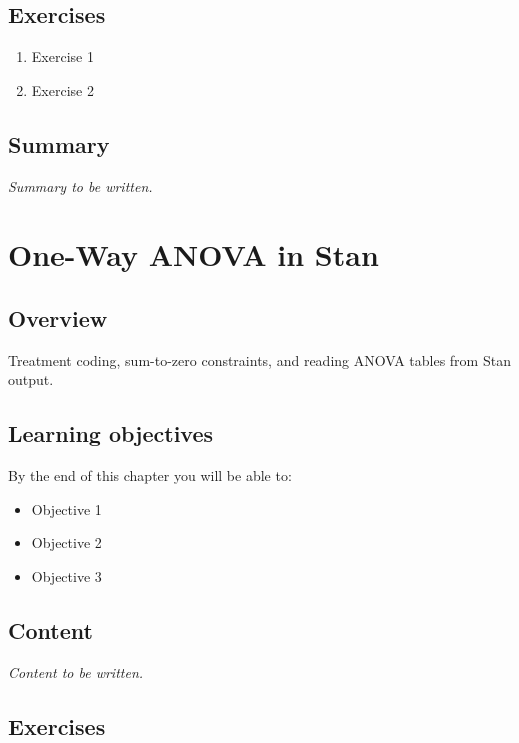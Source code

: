 \documentclass[
  11pt,
  a4paper,
  oneside,
  openany]{scrbook}
\providecommand{\tightlist}{%
  \setlength{\itemsep}{0pt}\setlength{\parskip}{0pt}}\usepackage{longtable,booktabs,array}
\begin{document}
\section{Exercises}\label{exercises-4}

\begin{enumerate}
\def\labelenumi{\arabic{enumi}.}
\tightlist
\item
  Exercise 1
\item
  Exercise 2
\end{enumerate}

\section{Summary}\label{summary-4}

\emph{Summary to be written.}

\chapter{One-Way ANOVA in Stan}\label{one-way-anova-in-stan}

\section{Overview}\label{overview-5}

Treatment coding, sum-to-zero constraints, and reading ANOVA tables from
Stan output.

\section{Learning objectives}\label{learning-objectives-5}

By the end of this chapter you will be able to:

\begin{itemize}
\tightlist
\item[$\square$]
  Objective 1
\item[$\square$]
  Objective 2
\item[$\square$]
  Objective 3
\end{itemize}

\section{Content}\label{content-4}

\emph{Content to be written.}

\section{Exercises}\label{exercises-5}
\end{document}

